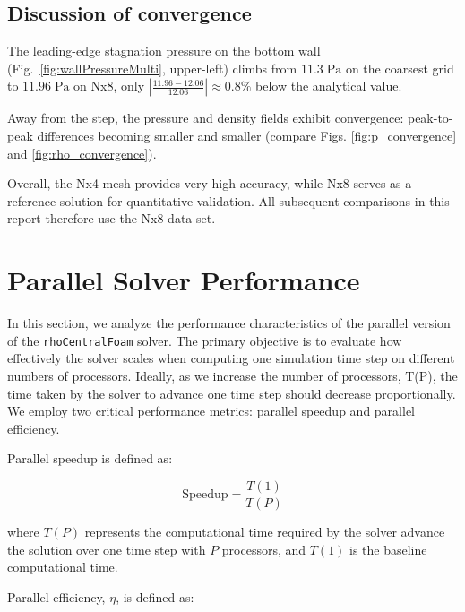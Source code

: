 \documentclass[11pt]{article}
\begin{document}
\subsection{Discussion of convergence}
The leading-edge stagnation pressure on the bottom wall (Fig.~\ref{fig:wallPressureMulti}, upper-left) climbs from $11.3 \; \text{Pa}$ on the coarsest grid to $11.96 \; \text{Pa}$ on Nx8, only $\displaystyle\left|\frac{11.96-12.06}{12.06}\right|\approx 0.8\%$ below the analytical 
value.
\vspace{3mm}

Away from the step, the pressure and density fields exhibit convergence:
peak-to-peak differences becoming smaller and smaller (compare Figs. \ref{fig:p_convergence} and \ref{fig:rho_convergence}).
\vspace{3mm}

Overall, the Nx4 mesh provides very high accuracy, while Nx8 serves as a reference solution for quantitative validation. All subsequent comparisons in this report therefore use the Nx8 data set.

\pagebreak

\section{Parallel Solver Performance}
In this section, we analyze the performance characteristics of the parallel version of the \texttt{rhoCentralFoam} solver. The primary objective is to evaluate how effectively the solver scales when computing one simulation time step on different numbers of processors. Ideally, as we increase the number of processors, T(P), the time taken by the solver to advance one time step should decrease proportionally. We employ two critical performance metrics: parallel speedup and parallel efficiency.

\vspace{3mm}

Parallel speedup is defined as:

\begin{equation}
    \text{Speedup} = \frac{{T(1)}}{T(P)}
\end{equation}

where \(T(P)\) represents the computational time required by the solver advance the solution over one 
time step with \(P\) processors, and \(T(1)\) is the baseline computational time.
\vspace{3mm}

Parallel efficiency, \(\eta\), is defined as:
\end{document}
